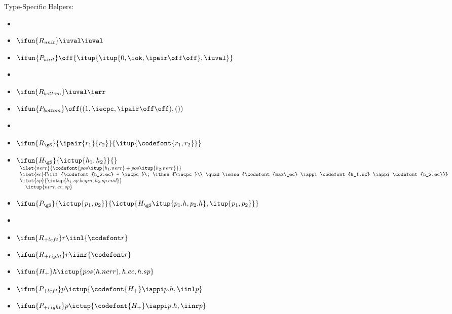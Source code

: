 \noindent
Type-Specific Helpers:

{\small
\begin{itemize}
\renewcommand{\labelitemi}{}

\item %
\item $\ifun {R_{unit}} \iuval \iuval$
\item $\ifun {P_{unit}} \off {\itup{\itup{0,\iok,\ipair \off \off},\iuval}}$

\item %
\item $\ifun {R_{bottom}} \iuval \ierr$
\item $\ifun {P_{bottom}} \off ((1,\iecpc,\ipair \off \off),())$

\item %
\item $\ifun {R_{\gS}} {\ipair {r_1} {r_2}} {\itup {\codefont{r_1,r_2}}}$
\item $\ifun{H_{\gS}} {\ictup{h_1,h_2}}{}$ \\
  $\begin{array}{l}
    \ilet {nerr} {\codefont{pos \itup{{h_1}.{nerr}} + pos \itup{{h_2}.{nerr}}}}\\
    \ilet {ec} {\iif {\codefont{h_2.ec} = \iecpc}\; \ithen {\iecpc}\\
    \quad \ielse {\codefont{max\_ec} \iappi \codefont{h_1.ec} \iappi \codefont{h_2.ec}}} \\
    \ilet {sp} {\ictup{h_1.sp.begin, h_2.sp.end}} \\
    \quad \ictup {nerr,ec,sp}
  \end{array}$

\item $\ifun {P_{\gS}} {\ictup{p_1, p_2}} {\ictup {H_{\gS} \itup{p_1.h,p_2.h},\itup{p_1,p_2}}}$

\item %
\item $\ifun {R_{+left}} r {\iinl {\codefont r}}$
\item $\ifun {R_{+right}} r {\iinr {\codefont r}}$

\item $\ifun {H_+} h {\ictup{pos(h.nerr),h.ec,h.sp}}$
\item $\ifun {P_{+left}} p {\ictup{\codefont{H_+} \iappi p.h, \iinl p}}$
\item $\ifun {P_{+right}} p {\ictup{\codefont{H_+} \iappi p.h, 
      \iinr  p}}$


\end{itemize}}
